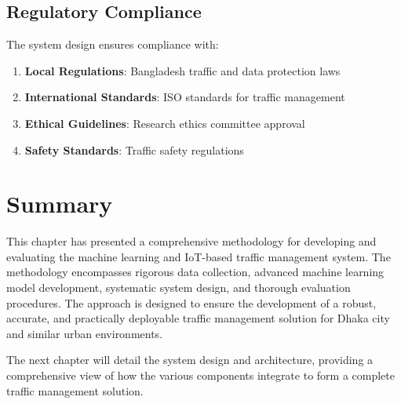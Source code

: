\subsection{Regulatory Compliance}

The system design ensures compliance with:

\begin{enumerate}
    \item \textbf{Local Regulations}: Bangladesh traffic and data protection laws
    \item \textbf{International Standards}: ISO standards for traffic management
    \item \textbf{Ethical Guidelines}: Research ethics committee approval
    \item \textbf{Safety Standards}: Traffic safety regulations
\end{enumerate}

\section{Summary}

This chapter has presented a comprehensive methodology for developing and evaluating the machine learning and IoT-based traffic management system. The methodology encompasses rigorous data collection, advanced machine learning model development, systematic system design, and thorough evaluation procedures. The approach is designed to ensure the development of a robust, accurate, and practically deployable traffic management solution for Dhaka city and similar urban environments.

The next chapter will detail the system design and architecture, providing a comprehensive view of how the various components integrate to form a complete traffic management solution. 